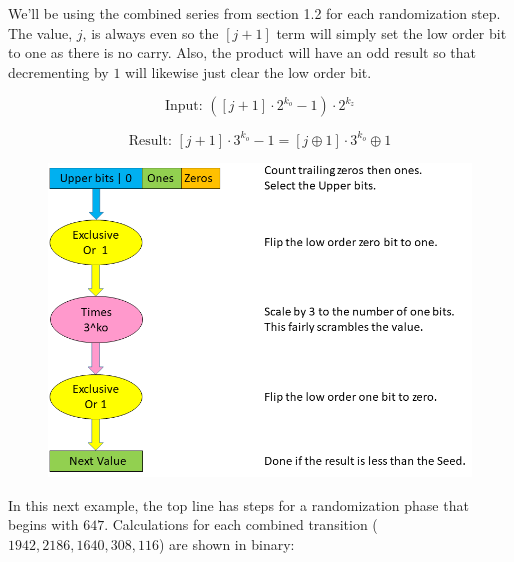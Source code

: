 \documentclass[letterpaper]{article}
\begin{document}
\begin{multicols}{2}
    We'll be using the combined series from section 1.2 for each randomization step. The value, $j$, is always even so the $[j + 1]$ term will simply set the low order bit to one as there is no carry. Also, the product will have an odd result so that decrementing by $1$ will likewise just clear the low order bit.

    \[
        \text{Input: } ([j + 1] \cdot 2^{k_o} - 1) \cdot 2^{k_z}
    \]

    \[
        \text{Result: } [j + 1] \cdot 3^{k_o} - 1 = [j \oplus 1] \cdot 3^{k_o} \oplus 1
    \]



    \begin{figure}
        \includegraphics[width=\textwidth]{collatz_even}
    \end{figure}

    \newpage

    In this next example, the top line has steps for a randomization phase that begins with $647$. Calculations for each combined transition ($1942, 2186, 1640, 308, 116$) are shown in binary:


\end{multicols}
\end{document}

